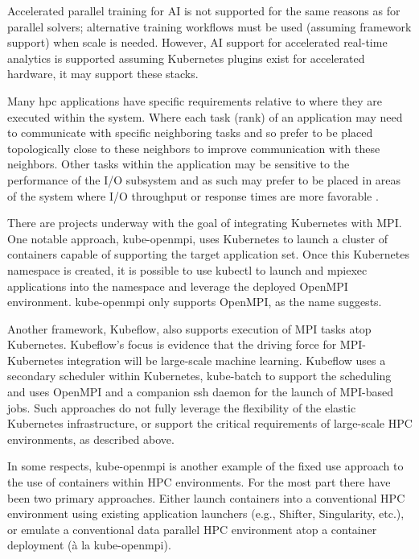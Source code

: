 \documentclass[conference]{IEEEtran}
\begin{document}
Accelerated parallel training for AI is not supported for the same reasons as for parallel solvers; alternative training
workflows must be used (assuming framework support) when scale is needed. However, AI support for accelerated real-time analytics is supported assuming Kubernetes plugins exist for accelerated hardware, it may support these stacks.

Many \gls{hpc} applications have specific requirements relative to where they are executed within the system. Where each task (rank) of an application may need to communicate with specific neighboring tasks and so prefer to be placed topologically close to these neighbors to improve communication with these neighbors. Other tasks within the application may be sensitive to the performance of the I/O subsystem and as such may prefer to be placed in areas of the system where I/O throughput or response times are more favorable \cite{stackhpc-kubernetes-mpi}.

There are projects underway with the goal of integrating Kubernetes with MPI. One notable approach, kube-openmpi, uses Kubernetes to launch a cluster of containers capable of supporting the target application set. Once this Kubernetes namespace is created, it is possible to use kubectl to launch and mpiexec applications into the namespace and leverage the deployed OpenMPI environment. kube-openmpi only supports OpenMPI, as the name suggests.

Another framework, Kubeflow, also supports execution of MPI tasks atop Kubernetes. Kubeflow’s focus is evidence that the driving force for MPI-Kubernetes integration will be large-scale machine learning. Kubeflow uses a secondary scheduler within Kubernetes, kube-batch to support the scheduling and uses OpenMPI and a companion ssh daemon for the launch of MPI-based jobs. Such approaches do not fully leverage the flexibility of the elastic Kubernetes infrastructure, or support the critical requirements of large-scale HPC environments, as described above.

In some respects, kube-openmpi is another example of the fixed use approach to the use of containers within HPC environments. For the most part there have been two primary approaches. Either launch containers into a conventional HPC environment using existing application launchers (e.g., Shifter, Singularity, etc.), or emulate a conventional data parallel HPC environment atop a container deployment (à la kube-openmpi).
\end{document}
